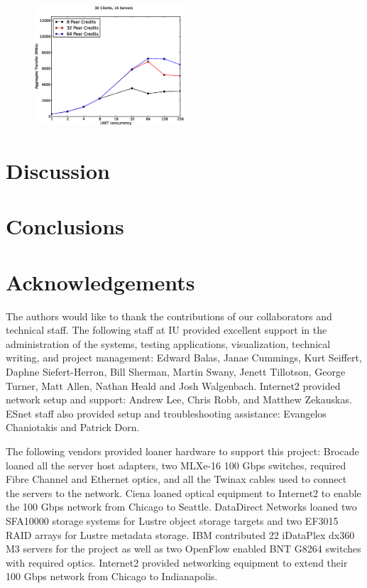 \documentclass[]{sigplan-proc}
\begin{document}
\begin{figure}
\centering
\includegraphics[width=0.50\textwidth]{figures/all_pc_plot.eps}
\caption{}
\label{}
\end{figure}

\section{Discussion}\label{sec:discussion} 

\section{Conclusions}\label{sec:conclusions}
  
\section{Acknowledgements}

The authors would like to thank the contributions of our collaborators and technical staff. The following
staff at IU provided excellent support in the administration of the systems, testing applications,
visualization, technical writing, and project management: Edward Balas, Janae Cummings, Kurt Seiffert, Daphne
Siefert-Herron, Bill Sherman, Martin Swany, Jenett Tillotson, George Turner, Matt Allen, Nathan Heald and Josh Walgenbach. Internet2 provided network setup and support: Andrew Lee, Chris Robb, and Matthew Zekauskas. ESnet staff also provided setup and troubleshooting assistance: Evangelos Chaniotakis and Patrick Dorn.

The following vendors provided loaner hardware to support this project: Brocade loaned all the server host
adapters, two MLXe-16 100 Gbps switches, required Fibre Channel and Ethernet optics, and all the Twinax cables
used to connect the servers to the network. Ciena loaned optical equipment to Internet2 to enable the 100 Gbps
network from Chicago to Seattle. DataDirect Networks loaned two SFA10000 storage systems for Lustre object
storage targets and two EF3015 RAID arrays for Lustre metadata storage. IBM contributed 22 iDataPlex dx360 M3
servers for the project as well as two OpenFlow enabled BNT G8264 switches with required optics. Internet2
provided networking equipment to extend their 100 Gbps network from Chicago to Indianapolis.




\end{document}
